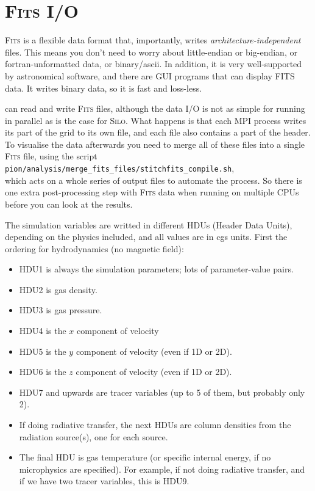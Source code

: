 \documentclass[a4paper,11pt]{report}
\begin{document}
\section{\textsc{Fits} I/O}
\textsc{Fits} is a flexible data format that, importantly, writes \emph{architecture-independent} files.
This means you don't need to worry about little-endian or big-endian, or fortran-unformatted data, or binary/ascii.
In addition, it is very well-supported by astronomical software, and there are GUI programs that can display FITS data.
It writes binary data, so it is fast and loss-less.

\pion{} can read and write \textsc{Fits} files, although the data I/O is not as simple for running in parallel as is the case for \textsc{Silo}.
What happens is that each MPI process writes its part of the grid to its own file, and each file also contains a part of the header.
To visualise the data afterwards you need to merge all of these files into a single \textsc{Fits} file, using the script \\
\verb|pion/analysis/merge_fits_files/stitchfits_compile.sh|,\\
which acts on a whole series of output files to automate the process.
So there is one extra post-processing step with \textsc{Fits} data when running on multiple CPUs before you can look at the results.

The simulation variables are writted in different HDUs (Header Data Units), depending on the physics included, and all values are in cgs units.
First the ordering for hydrodynamics (no magnetic field):
\begin{itemize}
\item HDU1 is always the simulation parameters; lots of parameter-value pairs.
\item HDU2 is gas density.
\item HDU3 is gas pressure.
\item HDU4 is the $x$ component of velocity
\item HDU5 is the $y$ component of velocity (even if 1D or 2D).
\item HDU6 is the $z$ component of velocity (even if 1D or 2D).
\item HDU7 and upwards are tracer variables (up to 5 of them, but probably only 2).
\item If doing radiative transfer, the next HDUs are column densities from the radiation source(s), one for each source.
\item The final HDU is gas temperature (or specific internal energy, if no microphysics are specified).
  For example, if not doing radiative transfer, and if we have two tracer variables, this is HDU9.
\end{itemize}
\end{document}
